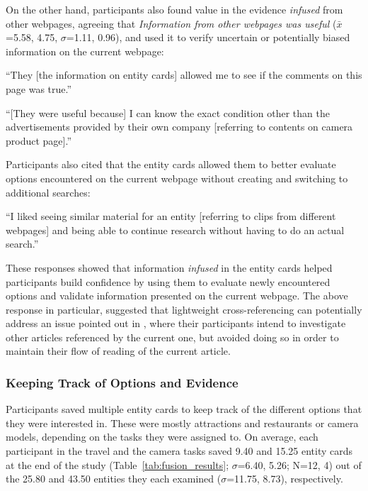 
On the other hand, participants also found value in the evidence \emph{infused} from other webpages, agreeing that \emph{Information from other webpages was useful} ($\bar{x}$=5.58, 4.75, $\sigma$=1.11, 0.96), and used it to verify uncertain or potentially biased information on the current webpage: 

\begin{tightquote}
``They [the information on entity cards] allowed me to see if the comments on this page was true.''

``[They were useful because] I can know the exact condition other than the advertisements provided by their own company [referring to contents on camera product page].''
\end{tightquote}

Participants also cited that the entity cards allowed them to better evaluate options encountered on the current webpage without creating and switching to additional searches:

\begin{tightquote}
``I liked seeing similar material for an entity [referring to clips from different webpages] and being able to continue research without having to do an actual search.''
\end{tightquote}

\noindent These responses showed that information \emph{infused} in the entity cards helped participants build confidence by using them to evaluate newly encountered options and validate information presented on the current webpage. The above response in particular, suggested that lightweight cross-referencing can potentially address an issue pointed out in \cite{marshall1999introducing}, where their participants intend to investigate other articles referenced by the current one, but avoided doing so in order to maintain their flow of reading of the current article.

\subsubsection{Keeping Track of Options and Evidence}
Participants saved multiple entity cards to keep track of the different options that they were interested in. These were mostly attractions and restaurants or camera models, depending on the tasks they were assigned to. On average, each participant in the travel and the camera tasks saved 9.40 and 15.25 entity cards at the end of the study (Table~\ref{tab:fusion_results}; $\sigma$=6.40, 5.26; N=12, 4)
out of the 25.80 and 43.50 entities they each examined ($\sigma$=11.75, 8.73), respectively. 
 
